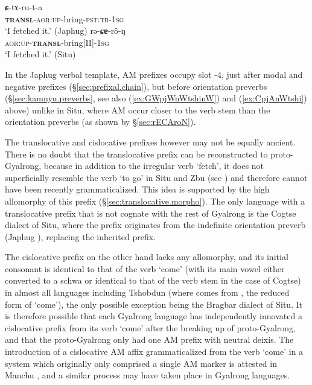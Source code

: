 \begin{exe}
 \ex  \label{sec:CtAruta}
 \gll  \textbf{ɕ}-tɤ-ru-t-a  \\
 \textbf{\textsc{transl}}-\textsc{aor}:\textsc{up}-bring-\textsc{pst}:\textsc{tr}-1\textsc{sg} \\
 \glt `I fetched it.' (Japhug)
 \ex  \label{sec:rECAroN}
 \gll   rə-\textbf{ɕɐ}-rô-ŋ  \\
\textsc{aor}:\textsc{up}-\textbf{\textsc{transl}}-bring[II]-1\textsc{sg} \\
\glt `I fetched it.' (Situ)
\end{exe}

In the Japhug verbal template, AM prefixes occupy slot -4, just after modal and negative prefixes (§\ref{sec:prefixal.chain}), but before orientation preverbs (§\ref{sec:kamnyu.preverbs}, see also (\ref{ex:GWpjWnWtshinW}) and (\ref{ex:CpjAnWtshi}) above) unlike in Situ, where AM occur closer to the verb stem than the orientation preverbs (as shown by §\ref{sec:rECAroN}).

The translocative and cislocative prefixes however may not be equally ancient. There is no doubt that the translocative prefix can be reconstructed to proto-Gyalrong, because in addition to the irregular verb `fetch', it does not superficially resemble the verb `to go' in Situ and Zbu (see ) and therefore cannot have been recently grammaticalized. This idea is supported by the high allomorphy of this prefix (§\ref{sec:translocative.morpho}). The only language with a translocative prefix that is not cognate with the rest of Gyalrong is the Cogtse dialect of Situ, where the prefix  originates from the indefinite orientation preverb (Japhug ), replacing the inherited prefix.

The cislocative prefix on the other hand lacks any allomorphy, and its initial consonant is identical to that of the verb `come' (with its main vowel either converted to a schwa or identical to that of the verb stem in the case of Cogtse) in almost all languages including Tshobdun (where  comes from , the reduced form of  `come'), the only possible exception being the Bragbar dialect of Situ. It is therefore possible that each Gyalrong language has independently innovated a cislocative prefix from its verb `come' after the breaking up of proto-Gyalrong, and that the proto-Gyalrong only had one AM prefix with neutral deixis. The introduction of a cislocative AM affix grammaticalized from the verb `come' in a system which originally only comprised a single AM marker is attested in Manchu \citep{fuente18am}, and a similar process may have taken place in Gyalrong languages.

